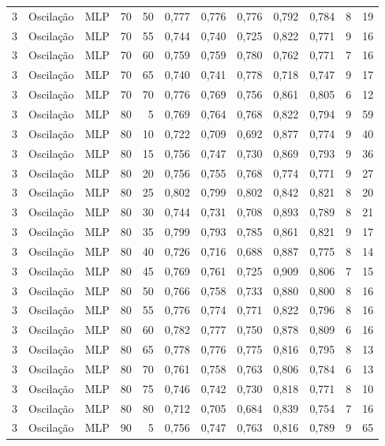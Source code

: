 \begin{longtable}{@{}rllrrrrrrrrr@{}}
3 & Oscilação & MLP & 70 & 50 & 0,777 & 0,776 & 0,776 & 0,792 & 0,784 & 8 & 19 \\
3 & Oscilação & MLP & 70 & 55 & 0,744 & 0,740 & 0,725 & 0,822 & 0,771 & 9 & 16 \\
3 & Oscilação & MLP & 70 & 60 & 0,759 & 0,759 & 0,780 & 0,762 & 0,771 & 7 & 16 \\
3 & Oscilação & MLP & 70 & 65 & 0,740 & 0,741 & 0,778 & 0,718 & 0,747 & 9 & 17 \\
3 & Oscilação & MLP & 70 & 70 & 0,776 & 0,769 & 0,756 & 0,861 & 0,805 & 6 & 12 \\
3 & Oscilação & MLP & 80 & 5 & 0,769 & 0,764 & 0,768 & 0,822 & 0,794 & 9 & 59 \\
3 & Oscilação & MLP & 80 & 10 & 0,722 & 0,709 & 0,692 & 0,877 & 0,774 & 9 & 40 \\
3 & Oscilação & MLP & 80 & 15 & 0,756 & 0,747 & 0,730 & 0,869 & 0,793 & 9 & 36 \\
3 & Oscilação & MLP & 80 & 20 & 0,756 & 0,755 & 0,768 & 0,774 & 0,771 & 9 & 27 \\
3 & Oscilação & MLP & 80 & 25 & 0,802 & 0,799 & 0,802 & 0,842 & 0,821 & 8 & 20 \\
3 & Oscilação & MLP & 80 & 30 & 0,744 & 0,731 & 0,708 & 0,893 & 0,789 & 8 & 21 \\
3 & Oscilação & MLP & 80 & 35 & 0,799 & 0,793 & 0,785 & 0,861 & 0,821 & 9 & 17 \\
3 & Oscilação & MLP & 80 & 40 & 0,726 & 0,716 & 0,688 & 0,887 & 0,775 & 8 & 14 \\
3 & Oscilação & MLP & 80 & 45 & 0,769 & 0,761 & 0,725 & 0,909 & 0,806 & 7 & 15 \\
3 & Oscilação & MLP & 80 & 50 & 0,766 & 0,758 & 0,733 & 0,880 & 0,800 & 8 & 16 \\
3 & Oscilação & MLP & 80 & 55 & 0,776 & 0,774 & 0,771 & 0,822 & 0,796 & 8 & 16 \\
3 & Oscilação & MLP & 80 & 60 & 0,782 & 0,777 & 0,750 & 0,878 & 0,809 & 6 & 16 \\
3 & Oscilação & MLP & 80 & 65 & 0,778 & 0,776 & 0,775 & 0,816 & 0,795 & 8 & 13 \\
3 & Oscilação & MLP & 80 & 70 & 0,761 & 0,758 & 0,763 & 0,806 & 0,784 & 6 & 13 \\
3 & Oscilação & MLP & 80 & 75 & 0,746 & 0,742 & 0,730 & 0,818 & 0,771 & 8 & 10 \\
3 & Oscilação & MLP & 80 & 80 & 0,712 & 0,705 & 0,684 & 0,839 & 0,754 & 7 & 16 \\
3 & Oscilação & MLP & 90 & 5 & 0,756 & 0,747 & 0,763 & 0,816 & 0,789 & 9 & 65 \\

\end{longtable}
